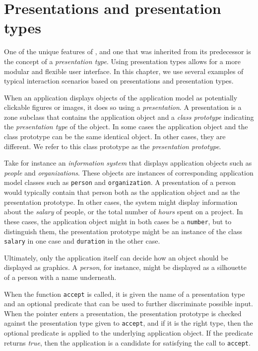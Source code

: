 \chapter{Presentations and presentation types}
\label{chap-presentations}

One of the unique features of \clim{}, and one that was inherited from
its predecessor \climtwo{} is the concept of a \emph{presentation
  type}.  Using presentation types allows for a more modular and
flexible user interface.  In this chapter, we use several examples of
typical interaction scenarios based on presentations and presentation
types. 

When an application displays objects of the application model as
potentially clickable figures or images, it does so using a
\emph{presentation}.  A presentation is a zone subclass that contains
the application object and a \emph{class prototype} indicating the
\emph{presentation type} of the object.  In some cases the application
object and the class prototype can be the same identical object.  In
other cases, they are different.  We refer to this class prototype as
the \emph{presentation prototype}. 

Take for instance an \emph{information system} that displays
application objects such as \emph{people} and \emph{organizations}.
These objects are instances of corresponding application model classes
such as \texttt{person} and \texttt{organization}.  A presentation of
a person would typically contain that person both as the application
object and as the presentation prototype.  In other cases, the system
might display information about the \emph{salary} of people, or the
total number of \emph{hours} spent on a project.  In these cases, the
application object might in both cases be a \cl{} \texttt{number}, but
to distinguish them, the presentation prototype might be an instance
of the class \texttt{salary} in one case and \texttt{duration} in the
other case.

Ultimately, only the application itself can decide how an object
should be displayed as graphics.  A \emph{person}, for instance, might
be displayed as a silhouette of a person with a name underneath.  

When the function \texttt{accept} is called, it is given the name of a
presentation type and an optional predicate that can be used to
further discriminate possible input.  When the pointer enters a
presentation, the presentation prototype is checked against the
presentation type given to \texttt{accept}, and if it is the right
type, then the optional predicate is applied to the underlying
application object.  If the predicate returns \emph{true}, then the
application is a candidate for satisfying the call to
\texttt{accept}.


